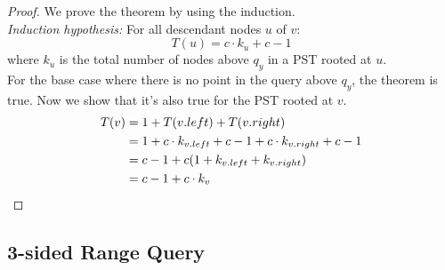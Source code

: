 \begin{proof}
We prove the theorem by using the induction.\\
\textit{Induction hypothesis:} For all descendant nodes $u$ of $v$:
\begin{equation*}
    T(u) = c\cdot k_u + c-1
\end{equation*}
where $k_u$ is the total number of nodes above $q_y$ in a PST rooted at $u$.\\

For the base case where there is no point in the query above $q_y$, the theorem is true. Now we show that it's also true for the PST rooted at $v$.
\begin{align*}
    T(v) &= 1 + T(v.left)+ T(v.right)\\
    &= 1 + c\cdot k_{v.left} + c-1 + c\cdot k_{v.right} + c-1 \\
    &= c-1 + c(1+k_{v.left}+k_{v.right})\\
    &= c-1 + c\cdot k_v \qedhere
\end{align*}
\end{proof}

\subsection{3-sided Range Query}

